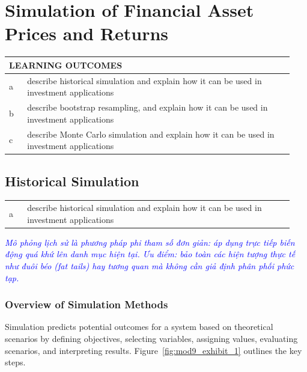 \chapter{Simulation of Financial Asset Prices and Returns}
\label{chap:Simulation of Financial Asset Prices and Returns}

\begin{center}
\begin{tabular}{p{0.06\linewidth} | p{0.88\linewidth}}
	\toprule
	\multicolumn{2}{l}{\textbf{LEARNING OUTCOMES}} \\
	\midrule
	a & describe historical simulation and explain how it can be used in investment applications \\
	\midrule
	b & describe bootstrap resampling, and explain how it can be used in investment applications \\
	\midrule
	c & describe Monte Carlo simulation and explain how it can be used in investment applications \\
	\bottomrule
\end{tabular}
\end{center}

\vspace{1.5em}

\section{Historical Simulation}
\label{sec:Historical Simulation}

\begin{center}
\begin{tabular}{p{0.06\linewidth} | p{0.88\linewidth}}
	a & describe historical simulation and explain how it can be used in investment applications \\
\end{tabular}
\end{center}

\textcolor{blue}{\textit{Mô phỏng lịch sử là phương pháp phi tham số đơn giản: áp dụng trực tiếp biến động quá khứ lên danh mục hiện tại. Ưu điểm: bảo toàn các hiện tượng thực tế như đuôi béo (fat tails) hay tương quan mà không cần giả định phân phối phức tạp.}}

\subsection{Overview of Simulation Methods}
Simulation predicts potential outcomes for a system based on theoretical scenarios by defining objectives, selecting variables, assigning values, evaluating scenarios, and interpreting results. Figure~\ref{fig:mod9_exhibit_1} outlines the key steps.

